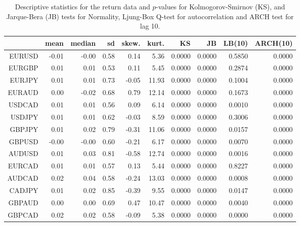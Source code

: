 \begin{table}[ht]
\centering
\begin{tabular}{rrrrrrrrrr}
  \hline
 & mean & median & sd & skew. & kurt. & KS & JB & LB(10) & ARCH(10) \\ 
  \hline
EURUSD & -0.01 & -0.00 & 0.58 & 0.14 & 5.36 & 0.0000 & 0.0000 & 0.5850 & 0.0000 \\ 
  EURGBP & 0.01 & 0.01 & 0.53 & 0.11 & 5.45 & 0.0000 & 0.0000 & 0.2874 & 0.0000 \\ 
  EURJPY & 0.01 & 0.01 & 0.73 & -0.05 & 11.93 & 0.0000 & 0.0000 & 0.1004 & 0.0000 \\ 
  EURAUD & 0.00 & -0.02 & 0.68 & 0.79 & 12.14 & 0.0000 & 0.0000 & 0.1673 & 0.0000 \\ 
  USDCAD & 0.01 & 0.01 & 0.56 & 0.09 & 6.14 & 0.0000 & 0.0000 & 0.0010 & 0.0000 \\ 
  USDJPY & 0.01 & 0.01 & 0.62 & -0.03 & 8.59 & 0.0000 & 0.0000 & 0.3006 & 0.0000 \\ 
  GBPJPY & 0.01 & 0.02 & 0.79 & -0.31 & 11.06 & 0.0000 & 0.0000 & 0.0157 & 0.0000 \\ 
  GBPUSD & -0.00 & -0.00 & 0.60 & -0.21 & 6.17 & 0.0000 & 0.0000 & 0.0070 & 0.0000 \\ 
  AUDUSD & 0.01 & 0.03 & 0.81 & -0.58 & 12.74 & 0.0000 & 0.0000 & 0.0016 & 0.0000 \\ 
  EURCAD & 0.01 & 0.01 & 0.57 & 0.13 & 5.44 & 0.0000 & 0.0000 & 0.8227 & 0.0000 \\ 
  AUDCAD & 0.02 & 0.04 & 0.58 & -0.24 & 13.03 & 0.0000 & 0.0000 & 0.0008 & 0.0000 \\ 
  CADJPY & 0.01 & 0.02 & 0.85 & -0.39 & 9.55 & 0.0000 & 0.0000 & 0.0147 & 0.0000 \\ 
  GBPAUD & 0.00 & 0.00 & 0.69 & 0.47 & 10.47 & 0.0000 & 0.0000 & 0.0040 & 0.0000 \\ 
  GBPCAD & 0.02 & 0.02 & 0.58 & -0.09 & 5.38 & 0.0000 & 0.0000 & 0.0000 & 0.0000 \\ 
   \hline
\end{tabular}
\caption{Descriptive statistics for the return data and
              $p$-values for Kolmogorov-Smirnov (KS), 
             and Jarque-Bera (JB) tests for Normality, 
             Ljung-Box Q-test for autocorrelation and ARCH test for lag 10.} 
\label{table:rets_desc_FX}
\end{table}

